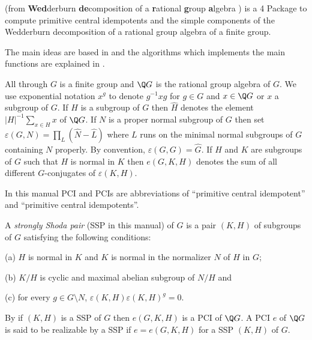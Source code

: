 
{\wedderga} (from {\bf Wed}derburn {\bf de}composition of a {\bf r}ational 
{\bf g}roup {\bf a}lgebra ) is a {\GAP}4 Package to compute primitive 
central idempotents and the simple components of the Wedderburn 
decomposition of a rational group algebra of a finite group. 

The main ideas are based in \cite{ORS} and the algorithms which implements 
the main functions are explained in \cite{OR}. 

All through $G$ is a finite group and $\Q G$ is the rational group algebra of $G$. 
We use exponential notation $x^g$ to denote $g^{-1} x g$ for $g\in G$ and 
$x\in \Q G$ or $x$ a subgroup of $G$.
If $H$ is a subgroup of $G$ then $\widehat{H}$ denotes the element 
$|H|^{-1}\sum_{x\in H} x$ of $\Q G$. If $N$ is a proper normal subgroup of $G$ then set 
    $\varepsilon(G,N) = \prod_{L} (\widehat{N}-\widehat{L})$
where $L$ runs on the minimal normal subgroups of $G$ containing $N$ properly. By 
convention, $\varepsilon(G,G)=\widehat{G}$. If $H$ and $K$ are subgroups of $G$ such 
that $H$ is normal in $K$ then $e(G,K,H)$ denotes the sum of all different 
$G$-conjugates of $\varepsilon(K,H)$. 

In this manual PCI and PCIs are abbreviations of ``primitive central idempotent'' 
and ``primitive central idempotents''. 


A {\it strongly Shoda pair} (SSP in this manual) of $G$ is a pair $(K,H)$ of 
subgroups of $G$ satisfying the following conditions: 
\beginlist
\item{(a)} $H$ is normal in $K$ and $K$ is normal in the normalizer $N$ of $H$ in $G$;
\item{(b)} $K/H$ is cyclic and maximal abelian subgroup of $N/H$ and 
\item{(c)} for every $g\in G\setminus N$,  $\varepsilon(K,H)\varepsilon(K,H)^g=0$.
\endlist

By \cite{ORS} if $(K,H)$ is a SSP of $G$ then $e(G,K,H)$ is a 
PCI of $\Q G$. A PCI $e$ of $\Q G$ is said to be realizable by a SSP if 
$e=e(G,K,H)$ for a SSP $(K,H)$ of $G$. 

